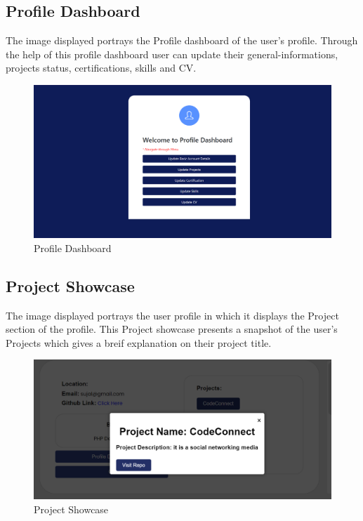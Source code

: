 \newpage
\subsection{Profile Dashboard}
The image displayed portrays the Profile dashboard of the user's profile. Through the help of this profile dashboard user can update their general-informations, projects status, certifications, skills and CV.   
\begin{figure}[H]
    \centering
    \includegraphics[width=1\textwidth]{Outcome-ss/profile-dashboard.png}
    \caption{Profile Dashboard}
    \label{fig:Profile Dashboard}
\end{figure}

\subsection{Project Showcase}
The image displayed portrays the user profile in which it displays the Project section of the profile. This Project showcase presents a snapshot of the user's Projects which gives a breif explanation on their project title.
\begin{figure}[H]
    \centering
    \includegraphics[width=1\textwidth]{Outcome-ss/project-showcase.png}
    \caption{Project Showcase}
    \label{fig:Project Showcase}
\end{figure}

